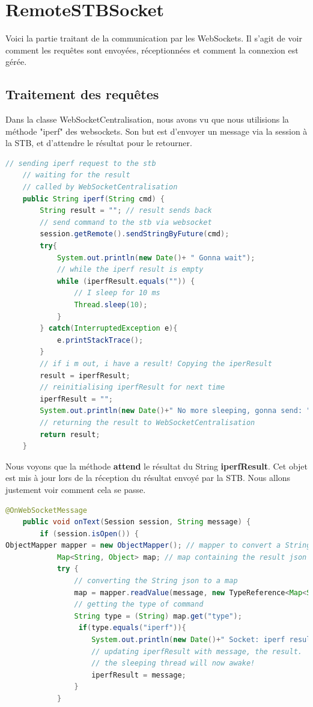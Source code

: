 \section{RemoteSTBSocket}
Voici la partie traitant de la communication par les WebSockets. Il s'agit de voir comment les requêtes sont envoyées, réceptionnées et comment la connexion est gérée.

\subsection{Traitement des requêtes}
Dans la classe WebSocketCentralisation, nous avons vu que nous utilisions la méthode "iperf" des websockets. Son but est d'envoyer un message via la session à la STB, et d'attendre le résultat pour le retourner.

\begin{lstlisting}[language=Java, caption={Méthode iperf du WebSocket}]
// sending iperf request to the stb
	// waiting for the result
	// called by WebSocketCentralisation
	public String iperf(String cmd) {
		String result = ""; // result sends back
		// send command to the stb via websocket
		session.getRemote().sendStringByFuture(cmd);
		try{
			System.out.println(new Date()+ " Gonna wait");
			// while the iperf result is empty
			while (iperfResult.equals("")) {
				// I sleep for 10 ms
				Thread.sleep(10);
			}
		} catch(InterruptedException e){
			e.printStackTrace();
		}
		// if i m out, i have a result! Copying the iperResult
		result = iperfResult;
		// reinitialising iperfResult for next time
		iperfResult = "";
		System.out.println(new Date()+" No more sleeping, gonna send: "+result);
		// returning the result to WebSocketCentralisation
		return result;
	}
\end{lstlisting}

Nous voyons que la méthode \textbf{attend} le résultat du String \textbf{iperfResult}. Cet objet est mis à jour lors de la réception du résultat envoyé par la STB. Nous allons justement voir comment cela se passe.

\begin{lstlisting}[language=Java, caption={Réception d'un retour de résultat STB to PRIS}]
@OnWebSocketMessage
    public void onText(Session session, String message) {
        if (session.isOpen()) {
ObjectMapper mapper = new ObjectMapper(); // mapper to convert a String JSon to a map
			Map<String, Object> map; // map containing the result json in format key/value
			try {
				// converting the String json to a map
				map = mapper.readValue(message, new TypeReference<Map<String, Object>>() {});
				// getting the type of command
				String type = (String) map.get("type");
				 if(type.equals("iperf")){
					System.out.println(new Date()+" Socket: iperf result received");
					// updating iperfResult with message, the result.
					// the sleeping thread will now awake!
					iperfResult = message;
				} 
			}
\end{lstlisting}


